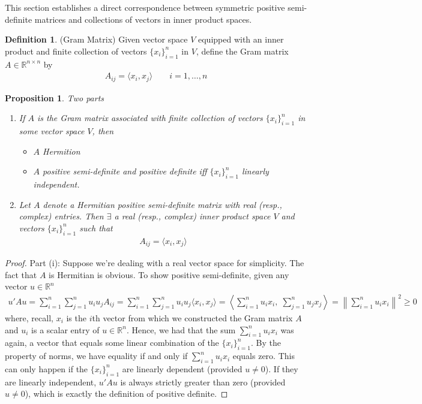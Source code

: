 \documentclass[12pt]{book}
\numberwithin{equation}{section} %
\theoremstyle{plain}
\newtheorem{prop}[thm]{Proposition}
\theoremstyle{definition}
\newtheorem{defn}[thm]{Definition}
\theoremstyle{remark}
\newcommand{\R}{\mathbb{R}}
\newcommand{\Rn}{\mathbb{R}^n}
\newcommand{\Rnn}{\mathbb{R}^{n\times n}}
\newcommand{\sumin}{\sum^n_{i=1}}
\begin{document}
This section establishes a direct correspondence between symmetric
positive semi-definite matrices and collections of vectors in inner
product spaces.

\begin{defn}(Gram Matrix)
Given vector space $V$ equipped with an inner product and
finite collection of vectors $\{x_i\}_{i=1}^n$ in $V$, define the Gram
matrix $A\in\Rnn$ by
\begin{align*}
  A_{ij} =
  \langle x_i,x_j\rangle
  \qquad
  i=1,\ldots,n
\end{align*}
\end{defn}

\begin{prop}
Two parts
\begin{enumerate}[label=\emph{(\roman*)}]
  \item
    If $A$ is the Gram matrix associated with finite collection of
    vectors $\{x_i\}_{i=1}^n$ in some vector space $V$, then
    \begin{itemize}
      \item $A$ Hermition
      \item $A$ positive semi-definite and positive definite iff
        $\{x_i\}_{i=1}^n$ linearly independent.
    \end{itemize}

  \item
    Let $A$ denote a Hermitian positive semi-definite matrix with real
    (resp., complex) entries.
    Then $\exists$ a real (resp., complex) inner product space $V$
    and vectors $\{x_i\}_{i=1}^n$ such that
    \begin{align*}
      A_{ij} = \langle x_i, x_j \rangle
    \end{align*}
\end{enumerate}
\end{prop}
\begin{proof}
Part (i):
Suppose we're dealing with a real vector space for simplicity.
The fact that $A$ is Hermitian is obvious.
To show positive semi-definite, given any vector $u\in\R^n$
\begin{align*}
  u'Au
  =
  \sum_{i=1}^n
  \sum_{j=1}^n
  u_i u_j A_{ij}
  =
  \sum_{i=1}^n
  \sum_{j=1}^n
  u_i u_j
  \langle x_i, x_j\rangle
  =
  \left\langle
  \sum_{i=1}^n
  u_ix_i,\;
  \sum_{j=1}^n
  u_j
  x_j
  \right\rangle
  =
  \left\lVert
  \sum_{i=1}^n
  u_ix_i
  \right\rVert^2
  \geq 0
\end{align*}
where, recall, $x_i$ is the $i$th vector from which we constructed the
Gram matrix $A$ and $u_i$ is a scalar entry of $u\in\Rn$.
Hence, we had that the sum $\sumin u_ix_i$ was again, a vector that
equals some linear combination of the $\{x_i\}_{i=1}^n$.
By the property of norms, we have equality if and only if
$\sumin u_ix_i$ equals zero.
This can only happen if the $\{x_i\}_{i=1}^n$ are linearly dependent
(provided $u\neq 0$).
If they are linearly independent, $u'Au$ is always strictly greater than
zero (provided $u\neq 0$), which is exactly the definition of positive
definite.
\end{proof}
\end{document}
